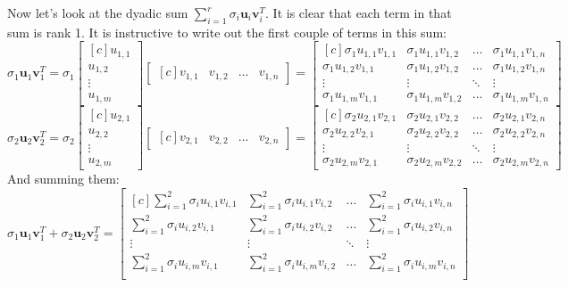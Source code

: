 \documentclass{tufte-handout}
\begin{document}
\noindent Now let's look at the dyadic sum $\sum_{i=1}^{r}\sigma_{i}\mathbf{u}_i\mathbf{v}_i^T$. It is clear that each term in that sum is rank 1. It is instructive to write out the first couple of terms in this sum:
\[
\sigma_{1}\mathbf{u}_1\mathbf{v}_1^T
=
\sigma_{1}
\begin{bmatrix*}[c]
u_{1,1}\\u_{1,2}\\ \vdots\\u_{1,m}
\end{bmatrix*}
\begin{bmatrix*}[c]
v_{1,1}&v_{1,2}& \dots&v_{1,n}
\end{bmatrix*}
=
\begin{bmatrix*}[c]
\sigma_{1}u_{1,1}v_{1,1}&\sigma_{1}u_{1,1}v_{1,2}&\dots&\sigma_{1}u_{1,1}v_{1,n} \\
\sigma_{1}u_{1,2}v_{1,1}&\sigma_{1}u_{1,2}v_{1,2}&\dots&\sigma_{1}u_{1,2}v_{1,n} \\
\vdots&\vdots&\ddots&\vdots\\
\sigma_{1}u_{1,m}v_{1,1}&\sigma_{1}u_{1,m}v_{1,2}&\dots&\sigma_{1}u_{1,m}v_{1,n}
\end{bmatrix*}
\]
\[
\sigma_{2}\mathbf{u}_2\mathbf{v}_2^T
=
\sigma_{2}
\begin{bmatrix*}[c]
u_{2,1}\\u_{2,2}\\ \vdots\\u_{2,m}
\end{bmatrix*}
\begin{bmatrix*}[c]
v_{2,1}&v_{2,2}& \dots&v_{2,n}
\end{bmatrix*}
=
\begin{bmatrix*}[c]
\sigma_{2}u_{2,1}v_{2,1}&\sigma_{2}u_{2,1}v_{2,2}&\dots&\sigma_{2}u_{2,1}v_{2,n} \\
\sigma_{2}u_{2,2}v_{2,1}&\sigma_{2}u_{2,2}v_{2,2}&\dots&\sigma_{2}u_{2,2}v_{2,n} \\
\vdots&\vdots&\ddots&\vdots\\
\sigma_{2}u_{2,m}v_{2,1}&\sigma_{2}u_{2,m}v_{2,2}&\dots&\sigma_{2}u_{2,m}v_{2,n}
\end{bmatrix*}
\]
And summing them:
\[
\sigma_{1}\mathbf{u}_1\mathbf{v}_1^T
+
\sigma_{2}\mathbf{u}_2\mathbf{v}_2^T
=
\begin{bmatrix*}[c]
\sum_{i=1}^{2}\sigma_{i}u_{i,1}v_{i,1}&\sum_{i=1}^{2}\sigma_{i}u_{i,1}v_{i,2}&\dots&\sum_{i=1}^{2}\sigma_{i}u_{i,1}v_{i,n} \\
\sum_{i=1}^{2}\sigma_{i}u_{i,2}v_{i,1}&\sum_{i=1}^{2}\sigma_{i}u_{i,2}v_{i,2}&\dots&\sum_{i=1}^{2}\sigma_{i}u_{i,2}v_{i,n} \\
\vdots&\vdots&\ddots&\vdots\\
\sum_{i=1}^{2}\sigma_{i}u_{i,m}v_{i,1}&\sum_{i=1}^{2}\sigma_{i}u_{i,m}v_{i,2}&\dots&\sum_{i=1}^{2}\sigma_{i}u_{i,m}v_{i,n} \\
\end{bmatrix*}
\]
\end{document}
